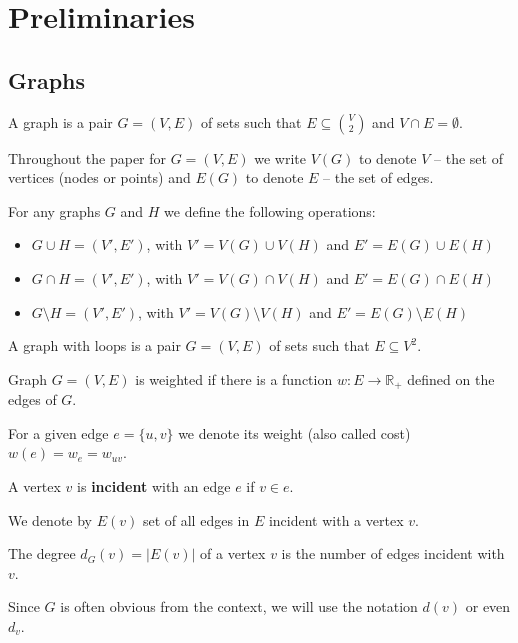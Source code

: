 \section{Preliminaries}

\subsection{Graphs}
\begin{definition} 
    A graph is a pair $G = (V, E)$ of sets such that $E \subseteq \binom{V}{2}$ and $V \cap E = \emptyset.$
\end{definition}
 Throughout the paper for $G = (V, E)$ we write $V(G)$ to denote $V$ -- the set of vertices (nodes or points) and $E(G)$ to denote $E$ -- the set of edges. 
 
 For any graphs $G$ and $H$ we define the following operations:
\begin{itemize}
  \item $G \cup H = (V', E')$, with $V' = V(G) \cup V(H)$ and $E' = E(G) \cup E(H)$
  \item $G \cap H = (V', E')$, with $V' = V(G) \cap V(H)$ and $E' = E(G) \cap E(H)$
  \item $G \setminus H = (V', E')$, with $V' = V(G) \setminus V(H)$ and $E' = E(G) \setminus E(H)$
\end{itemize}


\begin{definition} 
 A graph with loops is a pair $G = (V, E)$ of sets such that $E \subseteq V^2$.
\end{definition}

\begin{definition} 
    Graph $G = (V, E)$ is weighted if there is a function $w : E \xrightarrow{} \mathbb{R_+}$ defined on the edges of $G$. 
\end{definition}
For a given edge $e = \{u, v\}$ we denote its weight (also called cost) $w(e) = w_e = w_{uv}$.

\begin{definition}
    A vertex $v$ is \textbf{incident} with an edge $e$ if $v\in e$.
\end{definition}
We denote by $E(v)$ set of all edges in $E$ incident with a vertex $v$.

\begin{definition}
    The degree $d_G(v) = |E(v)|$ of a vertex $v$ is the number of edges incident with $v$.
\end{definition}
Since $G$ is often obvious from the context, we will use the notation $d(v)$ or even $d_v$.

